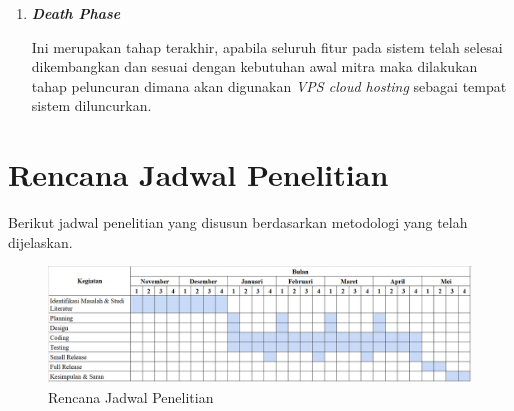 \begin{enumerate}
\begin{enumerate}[label*=\arabic*.]
\begin{enumerate}[label*=\arabic*.]
            \item \textbf{\textit{Death Phase}}

            Ini merupakan tahap terakhir, apabila seluruh fitur pada sistem telah selesai dikembangkan dan sesuai dengan kebutuhan awal mitra maka dilakukan tahap peluncuran dimana akan digunakan \textit{VPS cloud hosting} sebagai tempat sistem diluncurkan.


        \end{enumerate}
    \end{enumerate}
\end{enumerate}

\section{Rencana Jadwal Penelitian}

\noindent Berikut jadwal penelitian yang disusun berdasarkan metodologi yang telah dijelaskan.

\begin{figure}[!h]
    \includegraphics[width=1.2\linewidth, center]{images/metode/schedule.png}
    \caption{Rencana Jadwal Penelitian}
    \label{fig:flow-schedule}
\end{figure}